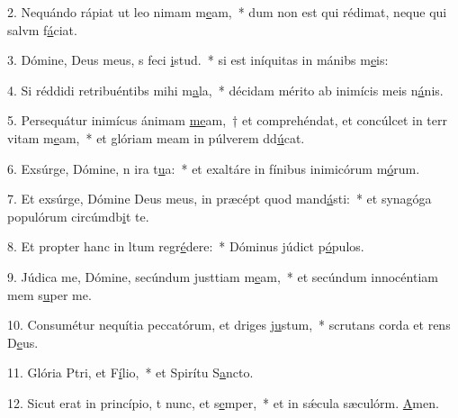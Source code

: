 2. Nequándo rápiat ut leo nimam m\uline{e}am,~* dum non est qui rédimat, neque qui salvm f\uline{á}ciat.\par 
3. Dómine, Deus meus, s feci \uline{i}stud.~* si est iníquitas in mánibs m\uline{e}is:\par 
4. Si réddidi retribuéntibs mihi m\uline{a}la,~* décidam mérito ab inimícis meis n\uline{á}nis.\par 
5. Persequátur inimícus ánimam \uline{me}am,~† et comprehéndat, et concúlcet in terr vitam m\uline{e}am,~* et glóriam meam in púlverem dd\uline{ú}cat.\par 
6. Exsúrge, Dómine, n ira t\uline{u}a:~* et exaltáre in fínibus inimicórum m\uline{ó}rum.\par 
7. Et exsúrge, Dómine Deus meus, in præcépt quod mand\uline{á}sti:~* et synagóga populórum circúmdb\uline{i}t te.\par 
8. Et propter hanc in ltum regr\uline{é}dere:~* Dóminus júdict p\uline{ó}pulos.\par 
9. Júdica me, Dómine, secúndum justtiam m\uline{e}am,~* et secúndum innocéntiam mem s\uline{u}per me.\par 
10. Consumétur nequítia peccatórum, et driges j\uline{u}stum,~* scrutans corda et rens D\uline{e}us.\par 
11. Glória Ptri, et F\uline{í}lio,~* et Spirítu S\uline{a}ncto.\par 
12. Sicut erat in princípio, t nunc, et s\uline{e}mper,~* et in sǽcula sæculórm. \uline{A}men.\par 
